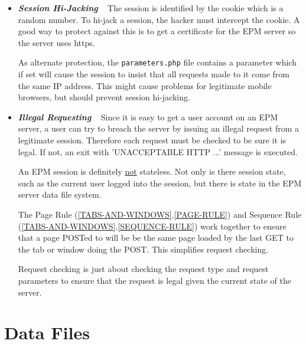 \documentclass[12pt]{article}
\newcommand{\key}[1]{{\bf \em #1}}
\newcommand{\sref}[2]{(\ref{#1}.\ref{#2})}
\begin{document}
\begin{itemize}

\item \key{Session Hi-Jacking} ~ The session is identified
by the cookie which is a random number.  To hi-jack a session,
the hacker must intercept the cookie.  A good way to 
protect against this is to get a certificate for the EPM
server so the server uses https.

As alternate protection, the {\tt parameters.php} file
contains a parameter which if set will cause the session
to insist that all requests made to it come from the same
IP address.  This might cause problems for legitimate mobile browsers,
but should prevent session hi-jacking.

\item \key{Illegal Requesting} ~ Since it is easy to get a user
account on an EPM server, a user can try to breach the server by issuing
an illegal request from a legitimate session.  Therefore each
request must be checked to be sure it is legal.  If not,
an exit with 'UNACCEPTABLE HTTP ...' message is executed.

An EPM session is definitely \underline{not} stateless.
Not only is there session state, such as the current
user logged into the session, but there is state in the
EPM server data file system.

The Page Rule \sref{TABS-AND-WINDOWS}{PAGE-RULE}
and Sequence Rule \sref{TABS-AND-WINDOWS}{SEQUENCE-RULE}
work together to ensure that a page POSTed to will be
be the same page loaded by the last GET to the tab or
window doing the POST.  This simplifies request checking.

Request checking is just about checking the request type and
request parameters to ensure that the request is legal given the
current state of the server.

\end{itemize}

\section{Data Files}
\end{document}

